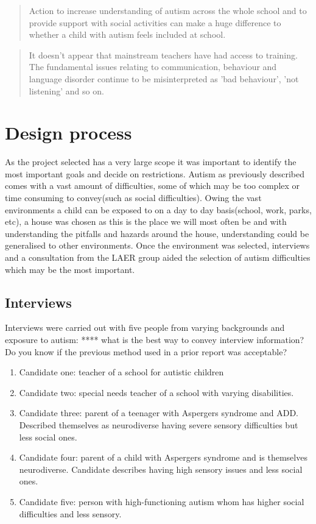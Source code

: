 \documentclass[11pt]{report}
\begin{document}
\begin{quote}
Action to increase understanding of autism across the whole school and to provide support with social activities can make a huge difference to whether a child with autism feels included at school.\cite{nasschool}
\end{quote}


\begin{quote}
It doesn't appear that mainstream teachers have had access to training. The fundamental issues relating to communication, behaviour and language disorder continue to be misinterpreted as 'bad behaviour', 'not listening' and so on.\cite{nasschool}
\end{quote}

\chapter{Design process}
As the project selected has a very large scope it was important to identify the most important goals and decide on restrictions. Autism as previously described comes with a vast amount of difficulties, some of which may be too complex or time consuming to convey(such as social difficulties). Owing the vast environments a child can be exposed to on a day to day basis(school, work, parks, etc), a house was chosen as this is the place we will most often be and with understanding the pitfalls and hazards around the house, understanding could be generalised to other environments. Once the environment was selected, interviews and a consultation from the LAER group aided the selection of autism difficulties which may be the most important.

\section{Interviews}

Interviews were carried out with five people from varying backgrounds and exposure to autism:
**** what is the best way to convey interview information? Do you know if the previous method used in a prior report was acceptable?

\begin{enumerate}
\item Candidate one: teacher of a school for autistic children
\item Candidate two: special needs teacher of a school with varying disabilities.
\item Candidate three: parent of a teenager with Aspergers syndrome and ADD. Described themselves as neurodiverse having severe sensory difficulties but less social ones.
\item Candidate four: parent of a child with Aspergers syndrome and is themselves neurodiverse. Candidate describes having high sensory issues and less social ones.
\item Candidate five: person with high-functioning autism whom has higher social difficulties and less sensory.
\end{enumerate}
\end{document}
